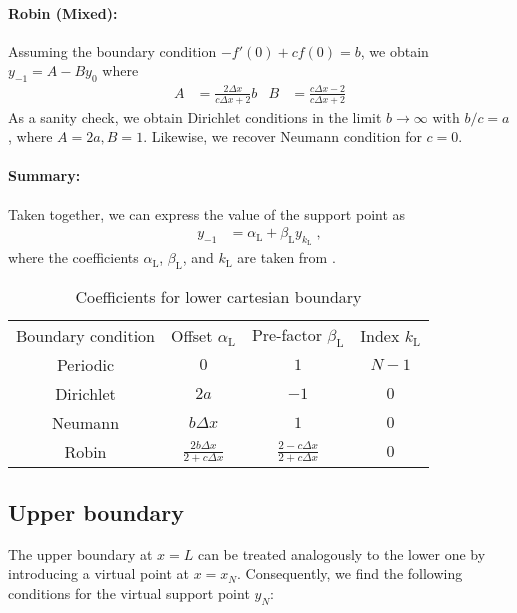 \documentclass[
	superscriptaddress,
	twocolumn,
	aps, pre
]{revtex4-1}
\newcommand{\dx}{\Delta x}
\renewcommand{\L}{_\mathrm{L}}
\begin{document}
\paragraph{Robin (Mixed):}
Assuming the boundary condition $-f'(0) + c f(0) = b $, we obtain $y_{-1} = A - B y_0$
where 
\begin{align}
	A &= \frac{2\dx}{c \dx + 2} b
&
	B &= \frac{c\dx - 2}{c \dx + 2}
\end{align}
As a sanity check, we obtain Dirichlet conditions in the limit $b \rightarrow \infty$ with $b/c = a$, where $A=2a, B=1$.
Likewise, we recover Neumann condition for $c=0$.

\paragraph{Summary:}
Taken together, we can express the value of the support point as
\begin{align}
	y_{-1} &= \alpha\L + \beta\L y_{k\L}
	\;,
\end{align}
where the coefficients $\alpha\L$, $\beta\L$, and $k\L$ are taken from .


\begin{table}[t]
\caption{\label{tab:cartesian_lower}%
Coefficients for lower cartesian boundary
}
\begin{ruledtabular}
	\begin{tabular}{cccc}
		Boundary condition & Offset $\alpha\L$ & Pre-factor $\beta\L$  & Index $k\L$\\
		\colrule
		Periodic & $0$ & $1$ & $N-1$ \\
		Dirichlet & $2a$ & $-1$ & $0$ \\
		Neumann & $b\dx$ & $1$  & $0$ \\
		Robin & $\frac{2b\dx}{2 + c \dx}$ &
				$\frac{2 - c\dx}{2 + c \dx}$ & $0$ \\
	\end{tabular}
\end{ruledtabular}
\end{table}


\subsection{Upper boundary}
The upper boundary at $x=L$ can be treated analogously to the lower one by introducing a virtual point at $x=x_N$.
Consequently, we find the following conditions for the virtual support point $y_N$:
\end{document}
